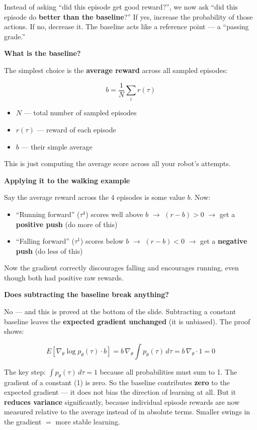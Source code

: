Instead of asking ``did this episode get good reward?'', we now ask ``did this episode do
\textbf{better than the baseline}?'' If yes, increase the probability of those actions. If no,
decrease it. The baseline acts like a reference point --- a ``passing grade.''

\textbf{What is the baseline?}

The simplest choice is the \textbf{average reward} across all sampled episodes:

\[
b = \frac{1}{N} \sum_i r(\tau)
\]

\begin{itemize}
  \item $N$ --- total number of sampled episodes
  \item $r(\tau)$ --- reward of each episode
  \item $b$ --- their simple average
\end{itemize}

This is just computing the average score across all your robot's attempts.

\textbf{Applying it to the walking example}

Say the average reward across the 4 episodes is some value $b$. Now:
\begin{itemize}
  \item ``Running forward'' ($\tau^4$) scores well above $b$ $\to$ $(r - b) > 0$ $\to$
    get a \textbf{positive push} (do more of this)
  \item ``Falling forward'' ($\tau^1$) scores below $b$ $\to$ $(r - b) < 0$ $\to$
    get a \textbf{negative push} (do less of this)
\end{itemize}

Now the gradient correctly discourages falling and encourages running, even though both had
positive raw rewards.

\textbf{Does subtracting the baseline break anything?}

No --- and this is proved at the bottom of the slide. Subtracting a constant baseline leaves the
\textbf{expected gradient unchanged} (it is unbiased). The proof shows:

\[
E[\nabla_\theta \log p_\theta(\tau) \cdot b]
=
b\,\nabla_\theta \int p_\theta(\tau)\, d\tau
=
b\,\nabla_\theta \cdot 1
= 0
\]

The key step: $\int p_\theta(\tau)\, d\tau = 1$ because all probabilities must sum to 1. The
gradient of a constant (1) is zero. So the baseline contributes \textbf{zero} to the expected
gradient --- it does not bias the direction of learning at all. But it \textbf{reduces variance}
significantly, because individual episode rewards are now measured relative to the average instead
of in absolute terms. Smaller swings in the gradient $=$ more stable learning.

